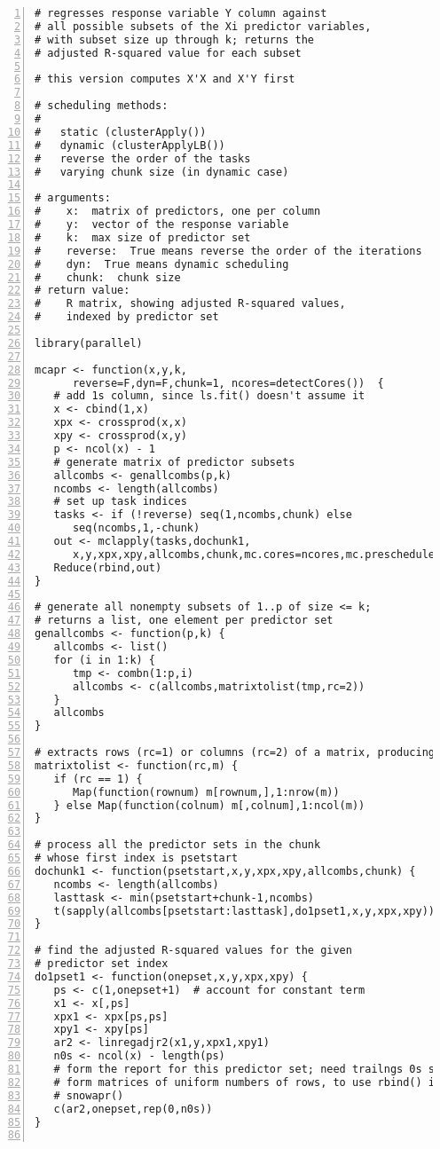\begin{lstlisting}[numbers=left]
# regresses response variable Y column against 
# all possible subsets of the Xi predictor variables, 
# with subset size up through k; returns the
# adjusted R-squared value for each subset

# this version computes X'X and X'Y first

# scheduling methods:
#
#   static (clusterApply())
#   dynamic (clusterApplyLB())
#   reverse the order of the tasks
#   varying chunk size (in dynamic case)

# arguments:
#    x:  matrix of predictors, one per column
#    y:  vector of the response variable
#    k:  max size of predictor set
#    reverse:  True means reverse the order of the iterations
#    dyn:  True means dynamic scheduling
#    chunk:  chunk size 
# return value:
#    R matrix, showing adjusted R-squared values, 
#    indexed by predictor set

library(parallel)

mcapr <- function(x,y,k,
      reverse=F,dyn=F,chunk=1, ncores=detectCores())  {
   # add 1s column, since ls.fit() doesn't assume it
   x <- cbind(1,x)
   xpx <- crossprod(x,x)
   xpy <- crossprod(x,y)
   p <- ncol(x) - 1
   # generate matrix of predictor subsets
   allcombs <- genallcombs(p,k)
   ncombs <- length(allcombs)
   # set up task indices 
   tasks <- if (!reverse) seq(1,ncombs,chunk) else 
      seq(ncombs,1,-chunk) 
   out <- mclapply(tasks,dochunk1,
      x,y,xpx,xpy,allcombs,chunk,mc.cores=ncores,mc.preschedule=!dyn)
   Reduce(rbind,out)
}

# generate all nonempty subsets of 1..p of size <= k; 
# returns a list, one element per predictor set
genallcombs <- function(p,k) {
   allcombs <- list()
   for (i in 1:k) {
      tmp <- combn(1:p,i)
      allcombs <- c(allcombs,matrixtolist(tmp,rc=2))
   }
   allcombs
}

# extracts rows (rc=1) or columns (rc=2) of a matrix, producing a list
matrixtolist <- function(rc,m) {
   if (rc == 1) {
      Map(function(rownum) m[rownum,],1:nrow(m))
   } else Map(function(colnum) m[,colnum],1:ncol(m))
}

# process all the predictor sets in the chunk 
# whose first index is psetstart
dochunk1 <- function(psetstart,x,y,xpx,xpy,allcombs,chunk) {
   ncombs <- length(allcombs)
   lasttask <- min(psetstart+chunk-1,ncombs)
   t(sapply(allcombs[psetstart:lasttask],do1pset1,x,y,xpx,xpy))
}

# find the adjusted R-squared values for the given 
# predictor set index
do1pset1 <- function(onepset,x,y,xpx,xpy) {
   ps <- c(1,onepset+1)  # account for constant term
   x1 <- x[,ps]
   xpx1 <- xpx[ps,ps]
   xpy1 <- xpy[ps]
   ar2 <- linregadjr2(x1,y,xpx1,xpy1)
   n0s <- ncol(x) - length(ps)
   # form the report for this predictor set; need trailngs 0s so as to
   # form matrices of uniform numbers of rows, to use rbind() in
   # snowapr()
   c(ar2,onepset,rep(0,n0s))
}


\end{lstlisting}
